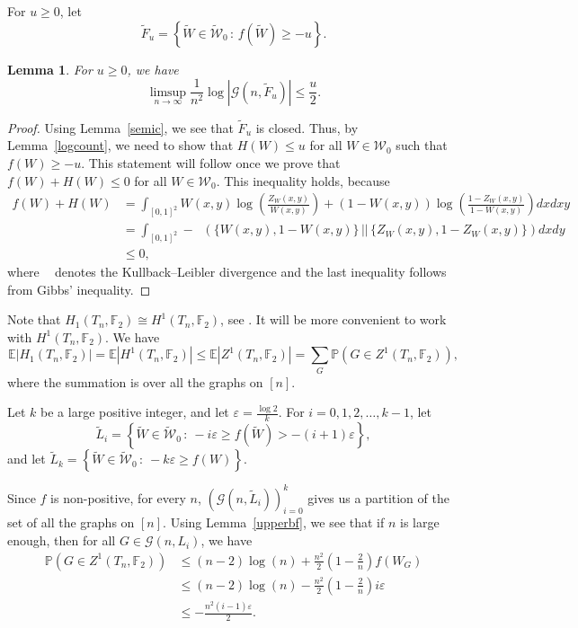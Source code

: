\documentclass[11pt,a4paper]{article}
\theoremstyle{plain}
\newtheorem{lemma}[theorem]{Lemma}
\theoremstyle{definition}
\DeclareMathOperator{\dkl}{D_{KL}}
\begin{document}
For $u\ge 0$, let
\[\widetilde{F}_u=\left\{\widetilde{W}\in \widetilde{\mathcal{W}}_0\,:\,f(\widetilde{W})\ge -u\right\}.\]

\begin{lemma}\label{LDFu}
For $u\ge 0$, we have
\[\limsup_{n\to\infty} \frac{1}{n^2}\log |\mathcal{G}(n,\widetilde{F}_u)|\le \frac{u}2.\]

\end{lemma}
\begin{proof}
    Using Lemma~\ref{semic}, we see that $\widetilde{F}_u$ is closed. Thus, by Lemma~\ref{logcount}, we need to show that $H(W)\le u$ for all $W\in \mathcal{W}_0$ such that $f(W)\ge -u$. This statement will follow once we prove that $f(W)+H(W)\le 0$ for all $W\in \mathcal{W}_0$. This inequality holds, because
    \begin{align*}
    f(W)+H(W)&=\int_{[0,1]^2} W(x,y)\log\left(\frac{Z_W(x,y)}{W(x,y)}\right)+(1-W(x,y))\log\left(\frac{1-Z_W(x,y)}{1-W(x,y)}\right) dx dxy\\&=\int_{[0,1]^2}-\dkl\left(\{W(x,y),1-W(x,y)\}\, \Big|\Big|\, \{Z_W(x,y),1-Z_W(x,y)\}\right)dxdy\\&\le 0,
    \end{align*}
    where $\dkl$ denotes the Kullback–Leibler divergence and the last inequality follows from Gibbs' inequality.
\end{proof}

Note that $H_1(T_n,\mathbb{F}_2)\cong H^1(T_n,\mathbb{F}_2)$, see \cite[Chapter 3.1]{hatcher2000algebraic}. It will be more convenient to work with $H^1(T_n,\mathbb{F}_2)$. We have
\begin{equation}\label{Eh1}\mathbb{E} |H_1(T_n,\mathbb{F}_2)|=\mathbb{E} |H^1(T_n,\mathbb{F}_2)|\le \mathbb{E} |Z^1(T_n,\mathbb{F}_2)|=\sum_G \mathbb{P}\left(G\in Z^1(T_n,\mathbb{F}_2)\right),\end{equation}
where the summation is over all the graphs on $[n]$.

Let $k$ be a large positive integer, and let $\varepsilon=\frac{\log 2}k$. For $i=0,1,2,\dots,k-1$, let
\[\widetilde{L}_i=\left\{\widetilde{W}\in \widetilde{\mathcal{W}}_0\,:\: -i\varepsilon \ge f(\widetilde{W})>-(i+1)\varepsilon \right\},\]
and let $\widetilde{L}_{k}=\left\{\widetilde{W}\in \widetilde{\mathcal{W}}_0\,:\: -k\varepsilon \ge f(W) \right\}$. 

Since $f$ is non-positive, for every $n$, $(\mathcal{G}(n,\widetilde{L}_i))_{i=0}^{k}$ gives us a partition of the set of all the graphs on $[n]$. Using Lemma~\ref{upperbf}, we see that if $n$ is large enough, then for all $G\in \mathcal{G}(n,L_i)$, we have
\begin{align}\label{Pbound}\mathbb{P}\left(G\in Z^1(T_n,\mathbb{F}_2)\right)&\le  (n-2)\log (n)+\frac{n^2}2\left(1-\frac{2}n\right)f(W_G)\\&\le(n-2)\log (n)-\frac{n^2}2\left(1-\frac{2}n\right)i\varepsilon\nonumber\\&\le -\frac{n^2(i-1)\varepsilon}2. \nonumber
\end{align}
\end{document}
